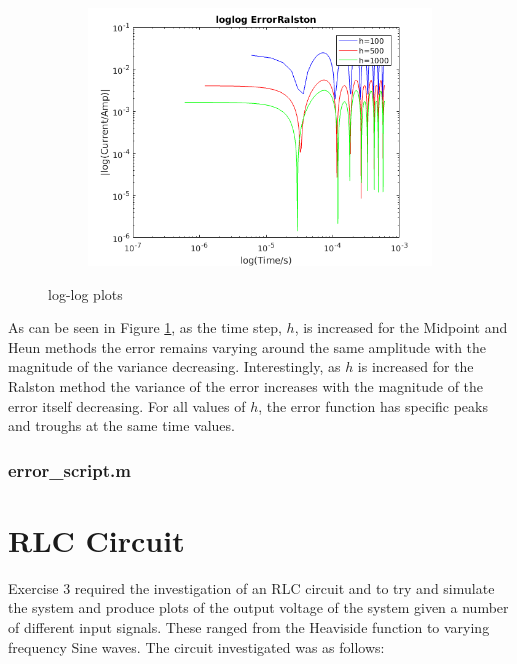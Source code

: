 \documentclass[a4paper, 12pt]{article}
\begin{document}
\begin{figure}
\begin{subfigure}{0.32\textwidth}
      \includegraphics[width=\textwidth]{ex2/loglogerrorralston.png}
      \end{subfigure}
\caption{log-log plots}
\label{fig:llplots}
\end{figure}

As can be seen in Figure \ref{fig:llplots}, as the time step, $h$, is increased for the Midpoint and Heun methods the error remains varying around the same amplitude with the magnitude of the variance decreasing. Interestingly, as $h$ is increased for the Ralston method the variance of the error increases with the magnitude of the error itself decreasing. For all values of $h$, the error function has specific peaks and troughs at the same time values.

\subsubsection{error\_script.m}




\newpage
\section{RLC Circuit}
Exercise 3 required the investigation of an RLC circuit and to try and simulate the system and produce plots of the output voltage of the system given a number of different input signals. These ranged from the Heaviside function to varying frequency Sine waves. The circuit investigated was as follows:
\end{document}
